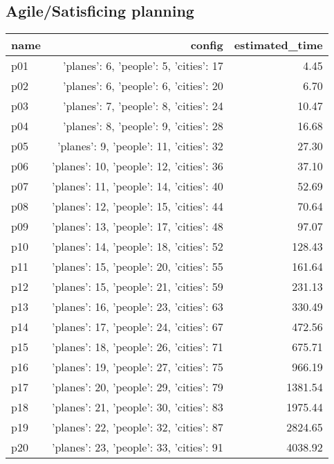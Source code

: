 \documentclass{article}
\begin{document}
                    

                                \subsection*{Agile/Satisficing planning}
                                
                            \begin{center}
                            \scriptsize
                            \begin{tabular}{@{}l|r|r@{}}
                            name & config & estimated\_time\\\midrule
                              p01&{'planes': 6, 'people': 5, 'cities': 17}&4.45\\
  p02&{'planes': 6, 'people': 6, 'cities': 20}&6.70\\
  p03&{'planes': 7, 'people': 8, 'cities': 24}&10.47\\
  p04&{'planes': 8, 'people': 9, 'cities': 28}&16.68\\
  p05&{'planes': 9, 'people': 11, 'cities': 32}&27.30\\
  p06&{'planes': 10, 'people': 12, 'cities': 36}&37.10\\
  p07&{'planes': 11, 'people': 14, 'cities': 40}&52.69\\
  p08&{'planes': 12, 'people': 15, 'cities': 44}&70.64\\
  p09&{'planes': 13, 'people': 17, 'cities': 48}&97.07\\
  p10&{'planes': 14, 'people': 18, 'cities': 52}&128.43\\
  p11&{'planes': 15, 'people': 20, 'cities': 55}&161.64\\
  p12&{'planes': 15, 'people': 21, 'cities': 59}&231.13\\
  p13&{'planes': 16, 'people': 23, 'cities': 63}&330.49\\
  p14&{'planes': 17, 'people': 24, 'cities': 67}&472.56\\
  p15&{'planes': 18, 'people': 26, 'cities': 71}&675.71\\
  p16&{'planes': 19, 'people': 27, 'cities': 75}&966.19\\
  p17&{'planes': 20, 'people': 29, 'cities': 79}&1381.54\\
  p18&{'planes': 21, 'people': 30, 'cities': 83}&1975.44\\
  p19&{'planes': 22, 'people': 32, 'cities': 87}&2824.65\\
  p20&{'planes': 23, 'people': 33, 'cities': 91}&4038.92\\

\end{tabular}
\end{center}
\end{document}
